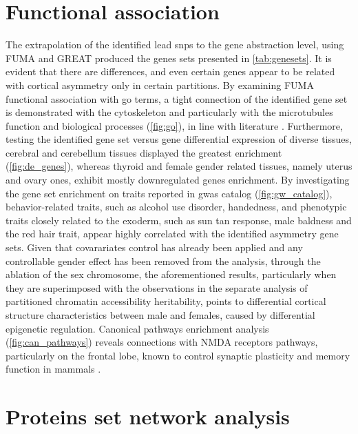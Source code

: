 \section{Functional association}
The extrapolation of the identified lead \acp{snp} to the gene abstraction level, using FUMA and GREAT produced the genes sets presented in \autoref{tab:genesets}. It is evident that there are differences, and even certain genes appear to be related with cortical asymmetry only in certain partitions. By examining FUMA functional association with \ac{go} terms, a tight connection of the identified gene set is demonstrated with the cytoskeleton and particularly with the microtubules function and biological processes (\autoref{fig:go}), in line with literature \cite{Sha2021}. Furthermore, testing the identified gene set versus gene differential expression of diverse tissues, cerebral and cerebellum tissues displayed the greatest enrichment (\autoref{fig:de_genes}), whereas thyroid and female gender related tissues, namely uterus and ovary ones, exhibit mostly downregulated genes enrichment. By investigating the gene set enrichment on traits reported in \ac{gwas} catalog (\autoref{fig:gw_catalog}), behavior-related traits, such as alcohol use disorder, handedness, and phenotypic traits closely related to the exoderm, such as sun tan response, male baldness and the red hair trait, appear highly correlated with the identified asymmetry gene sets. Given that covarariates control has already been applied and any controllable gender effect has been removed from the analysis, through the ablation of the sex chromosome, the aforementioned results, particularly when they are superimposed with the observations in the separate analysis of partitioned chromatin accessibility heritability, points to differential cortical structure characteristics between male and females, caused by differential epigenetic regulation. Canonical pathways enrichment analysis (\autoref{fig:can_pathways}) reveals connections with NMDA receptors pathways, particularly on the frontal lobe,  known to control synaptic plasticity and memory function in mammals \cite{Li2009}.

\section{Proteins set network analysis}

